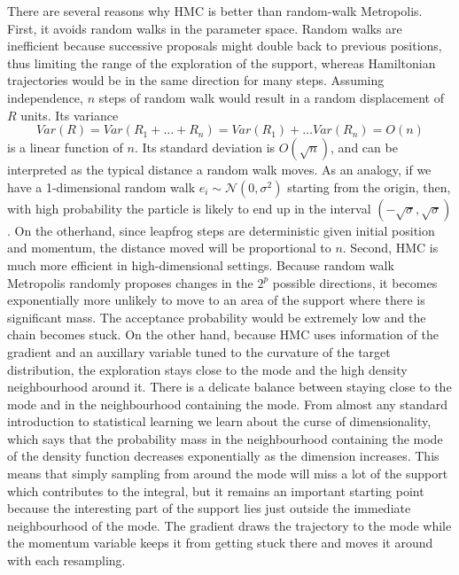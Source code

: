 \documentclass[]{report}
\begin{document}
There are several reasons why HMC is better than random-walk Metropolis. First,
it avoids random walks in the parameter space. Random walks are inefficient because successive
proposals might double back to previous positions, thus limiting the range of
the exploration of the support, whereas Hamiltonian trajectories would be in the
same direction for many steps. Assuming independence, $n$ steps of random walk
would result in a random displacement of $R$ units. Its variance  
\[Var(R) = Var(R_1 + \dots + R_n) = Var(R_1) + \dots Var(R_n) = O(n) \]
is a linear function of $n$. Its standard deviation is $O(\sqrt{n})$, and can be
interpreted as the typical distance a random walk moves. As an analogy, if we
have a 1-dimensional random walk $e_i \sim \mathcal{N}(0,\sigma^2)$ starting from
the origin, then,  with high probability the particle is likely to end up in the
interval $(-\sqrt{\sigma},\sqrt{\sigma})$. 
On the otherhand, since leapfrog steps are deterministic given initial position
and momentum, the distance moved will be proportional to $n$. 
Second, HMC is much more efficient in
high-dimensional settings. Because random walk Metropolis randomly proposes changes in
the $2^p$ possible directions, it becomes exponentially more unlikely to move
to an area of the support where there is significant mass. The acceptance
probability would be extremely low and the chain becomes stuck. On the other
hand, because HMC uses information of the gradient and an auxillary variable
tuned to the curvature of the target distribution, the exploration stays close
to the mode and the high density neighbourhood around it. There is a delicate
balance between staying close to the mode and in the neighbourhood containing
the mode. From almost any standard introduction to statistical learning \cite{friedman2001elements} we learn about the curse of dimensionality, which says that the probability mass in the neighbourhood containing the mode of the density function decreases exponentially as the dimension increases. This means that simply sampling from around the mode will miss a lot of the support which contributes to the integral, but it remains an important starting point because the interesting part of the support lies just outside the immediate neighbourhood of the mode. The gradient draws the
trajectory to
the mode while the momentum variable keeps it from getting stuck there and moves it around with each resampling.
\end{document}
